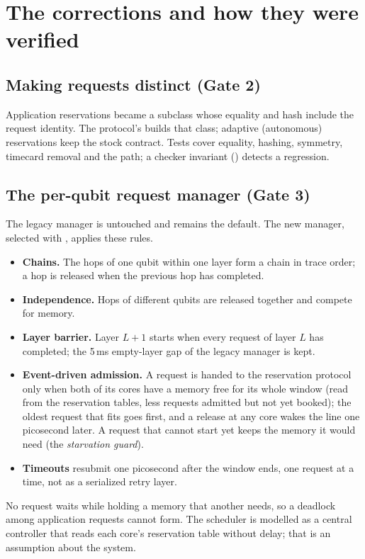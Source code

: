 \chapter{The corrections and how they were verified}
\label{ch:corrections}

\section{Making requests distinct (Gate 2)}
Application reservations became a subclass whose equality and hash include the request identity. The protocol's  builds
that class; adaptive (autonomous) reservations keep the stock contract. Tests cover equality, hashing, symmetry, timecard removal and
the  path; a checker invariant () detects a regression.

\section{The per-qubit request manager (Gate 3)}
The legacy manager is untouched and remains the default. The new manager, selected with , applies these rules.
\begin{itemize}
  \item \textbf{Chains.} The hops of one qubit within one layer form a chain in trace order; a hop is released when the previous hop has completed.
  \item \textbf{Independence.} Hops of different qubits are released together and compete for memory.
  \item \textbf{Layer barrier.} Layer $L+1$ starts when every request of layer $L$ has completed; the 5\,ms empty-layer gap of the legacy manager is kept.
  \item \textbf{Event-driven admission.} A request is handed to the reservation protocol only when both of its cores have a memory free for its
        whole window (read from the reservation tables, less requests admitted but not yet booked); the oldest request that fits goes first, and
        a release at any core wakes the line one picosecond later. A request that cannot start yet keeps the memory it would need
        (the \emph{starvation guard}).
  \item \textbf{Timeouts} resubmit one picosecond after the window ends, one request at a time, not as a serialized retry layer.
\end{itemize}
No request waits while holding a memory that another needs, so a deadlock among application requests cannot form. The scheduler is
modelled as a central controller that reads each core's reservation table without delay; that is an assumption about the system.

